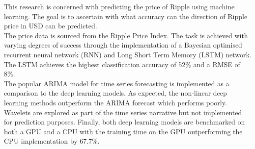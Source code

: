 \begin{Large}
\end{Large}
\noindent This research is concerned with predicting the price of Ripple using machine learning. The goal is to ascertain with what accuracy can the direction of Ripple price in USD can be predicted.\\

\noindent The price data is sourced from the Ripple Price Index. The task is achieved with varying degrees of success through the implementation of a Bayesian optimised recurrent neural network (RNN) and Long Short Term Memory (LSTM) network.  The LSTM achieves the highest classification accuracy of 52\% and a RMSE of 8\%.\\ 

\noindent The popular ARIMA model for time series forecasting is implemented as a comparison to the deep learning models. As expected,  the non-linear deep learning methods outperform the ARIMA forecast which performs poorly.  Wavelets are explored as part of the time series narrative but not implemented for prediction purposes.  Finally, both deep learning models are benchmarked on both a GPU and a CPU with the training time on the GPU outperforming the CPU implementation by 67.7\%.
